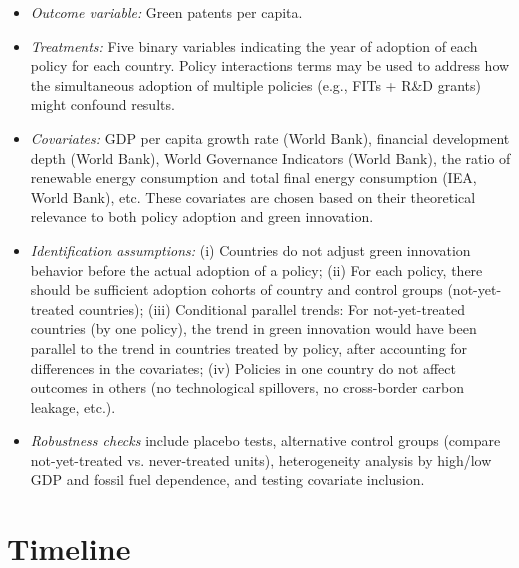 \documentclass[12pt]{article}
\begin{document}
\begin{itemize}
    \item \textit{Outcome variable:} Green patents per capita.
    \item \textit{Treatments:} Five binary variables indicating the year of adoption of each policy for each country. Policy interactions terms may be used to address how the simultaneous adoption of multiple policies (e.g., FITs + R\&D grants) might confound results.
    \item \textit{Covariates:} GDP per capita growth rate (World Bank), financial development depth (World Bank), World Governance Indicators (World Bank), the ratio of renewable energy consumption and total final energy consumption (IEA, World Bank), etc. These covariates are chosen based on their theoretical relevance to both policy adoption and green innovation.
    \item \textit{Identification assumptions:} (i) Countries do not adjust green innovation behavior before the actual adoption of a policy; (ii) For each policy, there should be sufficient adoption cohorts of country and control groups (not-yet-treated countries); (iii) Conditional parallel trends: For not-yet-treated countries (by one policy), the trend in green innovation would have been parallel to the trend in countries treated by policy, after accounting for differences in the covariates; (iv) Policies in one country do not affect outcomes in others (no technological spillovers, no cross-border carbon leakage, etc.).
    \item \textit{Robustness checks} include placebo tests, alternative control groups (compare not-yet-treated vs. never-treated units), heterogeneity analysis by high/low GDP and fossil fuel dependence, and testing covariate inclusion.
\end{itemize}

\section{Timeline}
\end{document}
